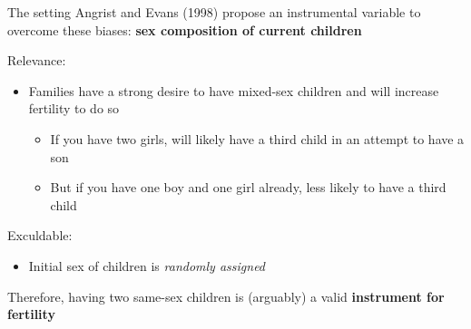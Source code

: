 \documentclass[
  ignorenonframetext,
]{beamer}
\providecommand{\tightlist}{%
  \setlength{\itemsep}{0pt}\setlength{\parskip}{0pt}}
\begin{document}
\begin{frame}{The setting}
\label{the-setting-2}
Angrist and Evans (1998) propose an instrumental variable to overcome
these biases: \textbf{sex composition of current children}

Relevance:

\begin{itemize}
\tightlist
\item
  Families have a strong desire to have mixed-sex children and will
  increase fertility to do so

  \begin{itemize}
  \tightlist
  \item
    If you have two girls, will likely have a third child in an attempt
    to have a son
  \item
    But if you have one boy and one girl already, less likely to have a
    third child
  \end{itemize}
\end{itemize}

Exculdable:

\begin{itemize}
\tightlist
\item
  Initial sex of children is \emph{randomly assigned}
\end{itemize}

Therefore, having two same-sex children is (arguably) a valid
\textbf{instrument for fertility}
\end{frame}
\end{document}

